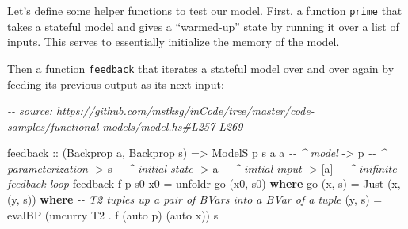 \documentclass[]{article}
\newenvironment{Shaded}{}{}
\newcommand{\CommentTok}[1]{\textcolor[rgb]{0.38,0.63,0.69}{\textit{#1}}}
\newcommand{\DataTypeTok}[1]{\textcolor[rgb]{0.56,0.13,0.00}{#1}}
\newcommand{\FunctionTok}[1]{\textcolor[rgb]{0.02,0.16,0.49}{#1}}
\newcommand{\KeywordTok}[1]{\textcolor[rgb]{0.00,0.44,0.13}{\textbf{#1}}}
\newcommand{\NormalTok}[1]{#1}
\newcommand{\OperatorTok}[1]{\textcolor[rgb]{0.40,0.40,0.40}{#1}}
\newcommand{\OtherTok}[1]{\textcolor[rgb]{0.00,0.44,0.13}{#1}}
\begin{document}
Let's define some helper functions to test our model. First, a function
\texttt{prime} that takes a stateful model and gives a ``warmed-up'' state by
running it over a list of inputs. This serves to essentially initialize the
memory of the model.

\begin{Shaded}
\end{Shaded}

Then a function \texttt{feedback} that iterates a stateful model over and over
again by feeding its previous output as its next input:

\begin{Shaded}
\begin{Highlighting}[]
\CommentTok{{-}{-} source: https://github.com/mstksg/inCode/tree/master/code{-}samples/functional{-}models/model.hs\#L257{-}L269}

\NormalTok{feedback}
\OtherTok{    ::}\NormalTok{ (}\DataTypeTok{Backprop}\NormalTok{ a, }\DataTypeTok{Backprop}\NormalTok{ s)}
    \OtherTok{=\textgreater{}} \DataTypeTok{ModelS}\NormalTok{ p s a a     }\CommentTok{{-}{-} \^{} model}
    \OtherTok{{-}\textgreater{}}\NormalTok{ p                  }\CommentTok{{-}{-} \^{} parameterization}
    \OtherTok{{-}\textgreater{}}\NormalTok{ s                  }\CommentTok{{-}{-} \^{} initial state}
    \OtherTok{{-}\textgreater{}}\NormalTok{ a                  }\CommentTok{{-}{-} \^{} initial input}
    \OtherTok{{-}\textgreater{}}\NormalTok{ [a]                }\CommentTok{{-}{-} \^{} inifinite feedback loop}
\NormalTok{feedback f p s0 x0 }\OtherTok{=}\NormalTok{ unfoldr go (x0, s0)}
  \KeywordTok{where}
\NormalTok{    go (x, s) }\OtherTok{=} \DataTypeTok{Just}\NormalTok{ (x, (y, s\textquotesingle{}))}
      \KeywordTok{where}
        \CommentTok{{-}{-} \textquotesingle{}T2\textquotesingle{} tuples up a pair of \textquotesingle{}BVar\textquotesingle{}s into a \textquotesingle{}BVar\textquotesingle{} of a tuple}
\NormalTok{        (y, s\textquotesingle{}) }\OtherTok{=}\NormalTok{ evalBP (}\FunctionTok{uncurry} \DataTypeTok{T2} \OperatorTok{.}\NormalTok{ f (auto p) (auto x)) s}
\end{Highlighting}
\end{Shaded}
\end{document}

